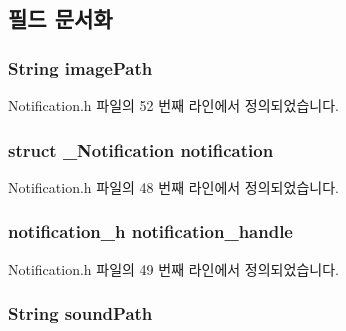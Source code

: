 \subsection{필드 문서화}
\hypertarget{struct_notification_extend_a7480fd65ec0c3010b75b111ed2611adb}{
\subsubsection[{image\-Path}]{\setlength{\rightskip}{0pt plus 5cm}String image\-Path}}\label{struct_notification_extend_a7480fd65ec0c3010b75b111ed2611adb}


Notification.\-h 파일의 52 번째 라인에서 정의되었습니다.

\hypertarget{struct_notification_extend_a7e3b5846fc96caa1bf325b063f5b56ec}{
\subsubsection[{notification}]{\setlength{\rightskip}{0pt plus 5cm}struct {\bf \-\_\-\-Notification} notification}}\label{struct_notification_extend_a7e3b5846fc96caa1bf325b063f5b56ec}


Notification.\-h 파일의 48 번째 라인에서 정의되었습니다.

\hypertarget{struct_notification_extend_a1c5a3131495086704fd49c62b63f95d6}{
\subsubsection[{notification\-\_\-handle}]{\setlength{\rightskip}{0pt plus 5cm}notification\-\_\-h notification\-\_\-handle}}\label{struct_notification_extend_a1c5a3131495086704fd49c62b63f95d6}


Notification.\-h 파일의 49 번째 라인에서 정의되었습니다.

\hypertarget{struct_notification_extend_ac2d6721b778cd06197fc40a5595c54e1}{
\subsubsection[{sound\-Path}]{\setlength{\rightskip}{0pt plus 5cm}String sound\-Path}}\label{struct_notification_extend_ac2d6721b778cd06197fc40a5595c54e1}


